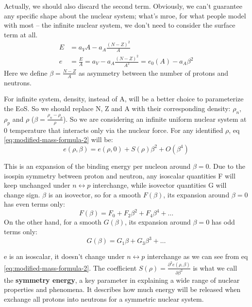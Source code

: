 Actually, we should also discard the second term. Obviously, we can't guarantee
any specific shape about the nuclear system; what's mroe, for what people model
with most -- the infinite nuclear system, we don't need to consider the surface 
term at all.
\begin{equation}
    \label{eq:modified-mass-formula-2}
    \begin{aligned}
	E &= a_V A - a_A\frac{(N-Z)^2}{A}  \\
	e &= \frac{E}{A} = a_V - a_A\frac{(N-Z)^2}{A^2} = e_0(A) - a_A\beta^2 
    \end{aligned}
\end{equation}
Here we define $\beta = \frac{N-Z}{A}$ as asymmetry between the number of protons and neutrons. 

For infinite system, density, instead of A, will be a better choice to parameterize
the EoS. So we should replace N, Z and A with their corresponding density: $\rho_n$, 
$\rho_p$ and $\rho$ ($\beta = \frac{\rho_n - \rho_p}{\rho}$). 
So we are considering an infinite uniform nuclear system at 0 temperature that interacts
only via the nuclear force. For any identified $\rho$,
eq \eqref{eq:modified-mass-formula-2} will be:
\begin{equation}
    \label{eq:symmetry-energy}
    e(\rho, \beta) = e(\rho, 0) + S(\rho)\beta^2 + O(\beta^4)
\end{equation}

This is an expansion of the binding energy per nucleon around $\beta = 0$.
Due to the isospin symmetry between proton and neutron, any isoscalar quantities
F will keep unchanged under $n \leftrightarrow p$ interchange, while isovector 
quantities G will change sign. $\beta$ is an isovector, so for a smooth $F(\beta)$,
its expansion around $\beta = 0$ has even terms only:
$$ F(\beta) = F_0 + F_2\beta^2 + F_4\beta^4 + \dots $$
On the other hand, for a smooth $G(\beta)$, its expansion around $\beta = 0$ has
odd terms only:
$$ G(\beta) = G_1\beta + G_3\beta^3 + \dots $$

e is an isoscalar, it doesn't change under $n \leftrightarrow p$ interchange 
as we can see from eq \eqref{eq:modified-mass-formula-2}. The coefficient 
$S(\rho) = \frac{\partial^2 e (\rho, \beta)}{\partial \beta^2}$ is
what we call the \textbf{symmetry energy}, a key parameter in explaining a wide
range of nuclear properties and phenomena. It describes how much energy will be
released when exchange all protons into neutrons for a symmetric nuclear system. 

